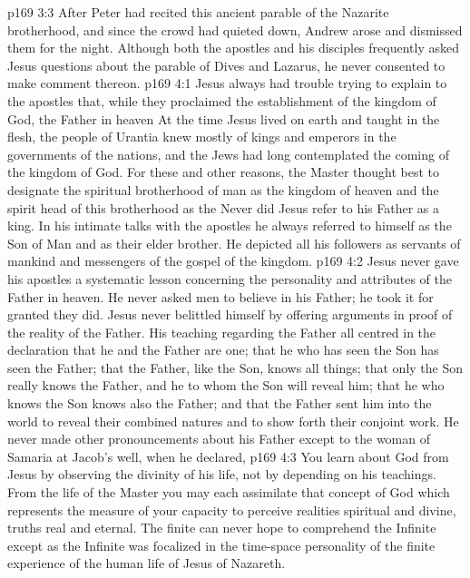 \vs p169 3:3 After Peter had recited this ancient parable of the Nazarite brotherhood, and since the crowd had quieted down, Andrew arose and dismissed them for the night. Although both the apostles and his disciples frequently asked Jesus questions about the parable of Dives and Lazarus, he never consented to make comment thereon.
\vs p169 4:1 Jesus always had trouble trying to explain to the apostles that, while they proclaimed the establishment of the kingdom of God, the Father in heaven  At the time Jesus lived on earth and taught in the flesh, the people of Urantia knew mostly of kings and emperors in the governments of the nations, and the Jews had long contemplated the coming of the kingdom of God. For these and other reasons, the Master thought best to designate the spiritual brotherhood of man as the kingdom of heaven and the spirit head of this brotherhood as the  Never did Jesus refer to his Father as a king. In his intimate talks with the apostles he always referred to himself as the Son of Man and as their elder brother. He depicted all his followers as servants of mankind and messengers of the gospel of the kingdom.
\vs p169 4:2 Jesus never gave his apostles a systematic lesson concerning the personality and attributes of the Father in heaven. He never asked men to believe in his Father; he took it for granted they did. Jesus never belittled himself by offering arguments in proof of the reality of the Father. His teaching regarding the Father all centred in the declaration that he and the Father are one; that he who has seen the Son has seen the Father; that the Father, like the Son, knows all things; that only the Son really knows the Father, and he to whom the Son will reveal him; that he who knows the Son knows also the Father; and that the Father sent him into the world to reveal their combined natures and to show forth their conjoint work. He never made other pronouncements about his Father except to the woman of Samaria at Jacob’s well, when he declared, 
\vs p169 4:3 \pc You learn about God from Jesus by observing the divinity of his life, not by depending on his teachings. From the life of the Master you may each assimilate that concept of God which represents the measure of your capacity to perceive realities spiritual and divine, truths real and eternal. The finite can never hope to comprehend the Infinite except as the Infinite was focalized in the time\hyp{}space personality of the finite experience of the human life of Jesus of Nazareth.
